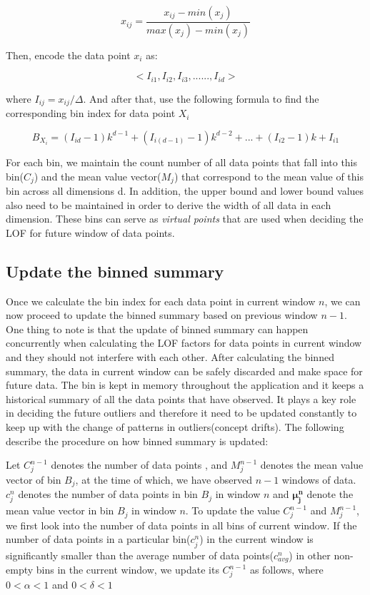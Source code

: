 \documentclass[11pt]{article}       %
\begin{document}
\[ x_{ij} = \frac{x_{ij} - min(x_j)}{max(x_j) - min(x_j)} \]

Then, encode the data point $x_i$ as:

\[ <I_{i1}, I_{i2}, I_{i3}, ......, I_{id}> \]

where $I_{ij} = x_{ij} / \Delta$. And after that, use the following formula to find the corresponding bin index for data point $X_i$

\begin{equation} \label{bin_index}
B_{X_{i}} = (I_{id} - 1)k^{d-1} + (I_{i(d-1)} - 1)k^{d-2} + ... + (I_{i2} -1)k + I_{i1}
\end{equation}

For each bin, we maintain the count number of all data points that fall into this bin($C_j$) and the mean value vector($M_j$) that correspond to the mean value of this bin across all dimensions d. In addition, the upper bound and lower bound values also need to be maintained in order to derive the width of all data in each dimension. These bins can serve as \textit{virtual points} that are used when deciding the LOF for future window of data points.

\subsection{Update the binned summary} \label{subsect4}

Once we calculate the bin index for each data point in current window $n$, we can now proceed to update the binned summary based on previous window $n-1$. One thing to note is that the update of binned summary can happen concurrently when calculating the LOF factors for data points in current window and they should not interfere with each other. After calculating the binned summary, the data in current window can be safely discarded and make space for future data. The bin is kept in memory throughout the application and it keeps a historical summary of all the data points that have observed. It plays a key role in deciding the future outliers and therefore it need to be updated constantly to keep up with the change of patterns in outliers(concept drifts). The following describe the procedure on how binned summary is updated:

Let $C_{j}^{n-1}$ denotes the number of data points , and $M_{j}^{n-1}$ denotes the mean value vector of bin $B_j$, at the time of which, we have observed $n-1$ windows of data. $c_{j}^{n}$ denotes the number of data points in bin $B_j$ in window $n$ and $\mathbf{\mu_j^n}$ denote the mean value vector in bin $B_j$ in window $n$. To update the value $C_{j}^{n-1}$ and $M_{j}^{n-1}$, we first look into the number of data points in all bins of current window. If the number of data points in a particular bin($c_{j}^{n}$) in the current window is significantly smaller than the average number of data points($c_{avg}^{n}$) in other non-empty bins in the current window, we update its $C_{j}^{n-1}$ as follows, where $0 < \alpha < 1$ and $0 < \delta < 1$  
\end{document}
